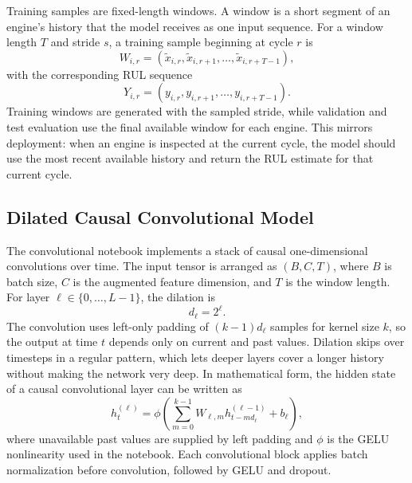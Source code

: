 \documentclass[11pt,a4paper]{article}
\begin{document}
Training samples are fixed-length windows. A window is a short segment of an engine's history that the model receives as one input sequence. For a window length $T$ and stride $s$, a training sample beginning at cycle $r$ is
\begin{equation}
    W_{i,r}
    =
    (\tilde{x}_{i,r}, \tilde{x}_{i,r+1}, \dots, \tilde{x}_{i,r+T-1}),
\end{equation}
with the corresponding RUL sequence
\begin{equation}
    Y_{i,r}
    =
    (y_{i,r}, y_{i,r+1}, \dots, y_{i,r+T-1}).
\end{equation}
Training windows are generated with the sampled stride, while validation and test evaluation use the final available window for each engine. This mirrors deployment: when an engine is inspected at the current cycle, the model should use the most recent available history and return the RUL estimate for that current cycle.

\subsection{Dilated Causal Convolutional Model}

The convolutional notebook implements a stack of causal one-dimensional convolutions over time. The input tensor is arranged as $(B,C,T)$, where $B$ is batch size, $C$ is the augmented feature dimension, and $T$ is the window length. For layer $\ell \in \{0,\dots,L-1\}$, the dilation is
\begin{equation}
    d_\ell = 2^\ell.
\end{equation}
The convolution uses left-only padding of $(k-1)d_\ell$ samples for kernel size $k$, so the output at time $t$ depends only on current and past values. Dilation skips over timesteps in a regular pattern, which lets deeper layers cover a longer history without making the network very deep. In mathematical form, the hidden state of a causal convolutional layer can be written as
\begin{equation}
    h_{t}^{(\ell)}
    =
    \phi\left(
        \sum_{m=0}^{k-1}
        W_{\ell,m} h_{t-md_\ell}^{(\ell-1)}
        + b_\ell
    \right),
\end{equation}
where unavailable past values are supplied by left padding and $\phi$ is the GELU nonlinearity used in the notebook. Each convolutional block applies batch normalization before convolution, followed by GELU and dropout.
\end{document}
